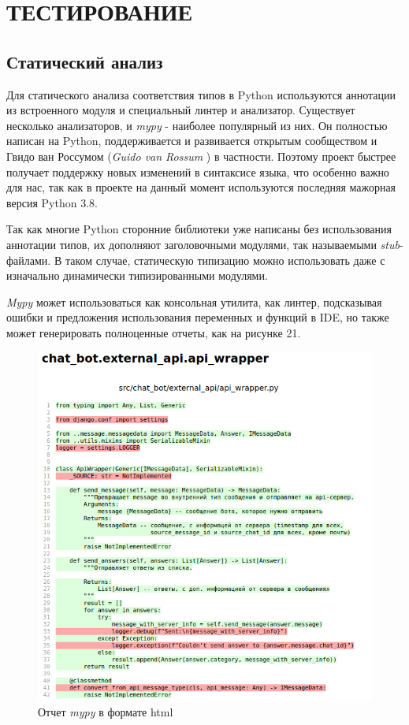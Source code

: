 \section{ТЕСТИРОВАНИЕ}
    \subsection{Статический анализ}
    Для статического анализа соответствия типов в Python используются аннотации 
    из встроенного модуля  и специальный линтер и анализатор.
    Существует несколько анализаторов,
    и \textit{mypy} \cite{docs.mypy} - наиболее популярный из них.
    Он полностью написан на Python, поддерживается и развивается открытым
    сообществом 
    и Гвидо ван Россумом (\textit{Guido van Rossum} \cite{guido.van.rossum})
    в частности. Поэтому проект быстрее получает поддержку новых изменений в
    синтаксисе языка, что особенно важно для нас, так как в проекте на данный
    момент используются последняя мажорная версия Python 3.8.

    Так как многие Python сторонние библиотеки уже написаны без использования
    аннотации типов, их дополняют заголовочными модулями,
    так называемыми \textit{stub}-файлами. В таком случае, статическую типизацию
    можно использовать даже с изначально динамически типизированными модулями.
    
    \textit{Mypy} может использоваться как консольная утилита,
    как линтер, подсказывая ошибки и предложения использования переменных и 
    функций в IDE, 
    но также может генерировать полноценные отчеты, как на рисунке 21.
    \begin{figure}[H]
        \centering
        \includegraphics[width=0.7\linewidth]{static/mypy-report.png}
        \caption{Отчет \textit{mypy} в формате html}
        \label{fig:mypy-report}
    \end{figure}
    
